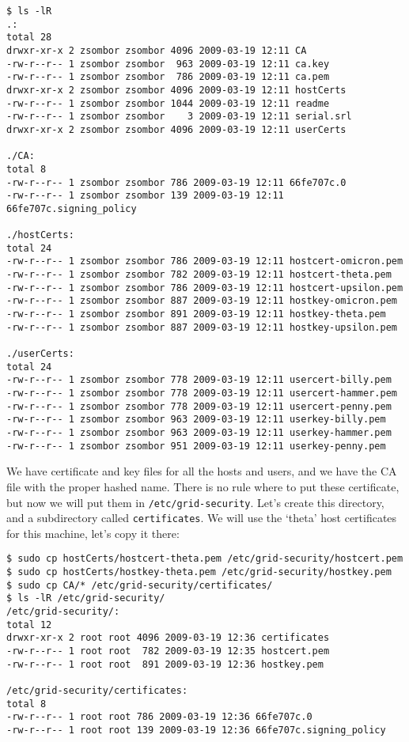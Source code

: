 \documentclass{book}
\begin{document}
\begin{verbatim}
$ ls -lR
.:
total 28
drwxr-xr-x 2 zsombor zsombor 4096 2009-03-19 12:11 CA
-rw-r--r-- 1 zsombor zsombor  963 2009-03-19 12:11 ca.key
-rw-r--r-- 1 zsombor zsombor  786 2009-03-19 12:11 ca.pem
drwxr-xr-x 2 zsombor zsombor 4096 2009-03-19 12:11 hostCerts
-rw-r--r-- 1 zsombor zsombor 1044 2009-03-19 12:11 readme
-rw-r--r-- 1 zsombor zsombor    3 2009-03-19 12:11 serial.srl
drwxr-xr-x 2 zsombor zsombor 4096 2009-03-19 12:11 userCerts

./CA:
total 8
-rw-r--r-- 1 zsombor zsombor 786 2009-03-19 12:11 66fe707c.0
-rw-r--r-- 1 zsombor zsombor 139 2009-03-19 12:11 66fe707c.signing_policy

./hostCerts:
total 24
-rw-r--r-- 1 zsombor zsombor 786 2009-03-19 12:11 hostcert-omicron.pem
-rw-r--r-- 1 zsombor zsombor 782 2009-03-19 12:11 hostcert-theta.pem
-rw-r--r-- 1 zsombor zsombor 786 2009-03-19 12:11 hostcert-upsilon.pem
-rw-r--r-- 1 zsombor zsombor 887 2009-03-19 12:11 hostkey-omicron.pem
-rw-r--r-- 1 zsombor zsombor 891 2009-03-19 12:11 hostkey-theta.pem
-rw-r--r-- 1 zsombor zsombor 887 2009-03-19 12:11 hostkey-upsilon.pem

./userCerts:
total 24
-rw-r--r-- 1 zsombor zsombor 778 2009-03-19 12:11 usercert-billy.pem
-rw-r--r-- 1 zsombor zsombor 778 2009-03-19 12:11 usercert-hammer.pem
-rw-r--r-- 1 zsombor zsombor 778 2009-03-19 12:11 usercert-penny.pem
-rw-r--r-- 1 zsombor zsombor 963 2009-03-19 12:11 userkey-billy.pem
-rw-r--r-- 1 zsombor zsombor 963 2009-03-19 12:11 userkey-hammer.pem
-rw-r--r-- 1 zsombor zsombor 951 2009-03-19 12:11 userkey-penny.pem
\end{verbatim}

We have certificate and key files for all the hosts and users, and we have the CA file with the proper hashed name.
There is no rule where to put these certificate, but now we will put them in \verb!/etc/grid-security!. Let's create this directory, and a subdirectory called \verb!certificates!. We will use the `theta' host certificates for this machine, let's copy it there:

\begin{verbatim}
$ sudo cp hostCerts/hostcert-theta.pem /etc/grid-security/hostcert.pem
$ sudo cp hostCerts/hostkey-theta.pem /etc/grid-security/hostkey.pem
$ sudo cp CA/* /etc/grid-security/certificates/
$ ls -lR /etc/grid-security/
/etc/grid-security/:
total 12
drwxr-xr-x 2 root root 4096 2009-03-19 12:36 certificates
-rw-r--r-- 1 root root  782 2009-03-19 12:35 hostcert.pem
-rw-r--r-- 1 root root  891 2009-03-19 12:36 hostkey.pem

/etc/grid-security/certificates:
total 8
-rw-r--r-- 1 root root 786 2009-03-19 12:36 66fe707c.0
-rw-r--r-- 1 root root 139 2009-03-19 12:36 66fe707c.signing_policy
\end{verbatim}
\end{document}
